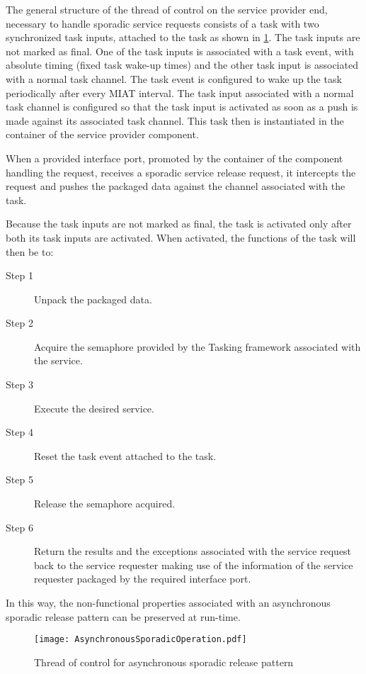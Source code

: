 The general structure of the thread of control on the service provider end, necessary to handle sporadic service requests consists of a task with two synchronized task inputs, attached to the task as shown in \cref{fig: Asynchronous sporadic}. The task inputs are not marked as final. One of the task inputs is associated with a task event, with absolute timing (fixed task wake-up times) and the other task input is associated with a normal task channel. The task event is configured to wake up the task periodically after every MIAT interval. The task input associated with a normal task channel is configured so that the task input is activated as soon as a push is made against its associated task channel. This task then is instantiated in the container of the service provider component.   

When a provided interface port, promoted by the container of the component handling the request, receives a sporadic service release request, it intercepts the request and pushes the packaged data against the channel associated with the task. 

Because the task inputs are not marked as final, the task is activated only after both its task inputs are activated. When activated, the functions of the task will then be to:
 
\begin{description}
\item [Step 1] Unpack the packaged data.
\item [Step 2] Acquire the semaphore provided by the Tasking framework associated with the service.
\item [Step 3] Execute the desired service.
\item [Step 4] Reset the task event attached to the task.
\item [Step 5] Release the semaphore acquired. 
\item [Step 6] Return the results and the exceptions associated with the service request back to the service requester making use of the information of the service requester packaged by the required interface port. 
\end{description}

In this way, the non-functional properties associated with an asynchronous sporadic release pattern can be preserved at run-time.

\begin{figure}[h]
	\centering
	\texttt{[image: AsynchronousSporadicOperation.pdf]}
	\caption{Thread of control for asynchronous sporadic release pattern}
	\label{fig: Asynchronous sporadic}
\end{figure}

